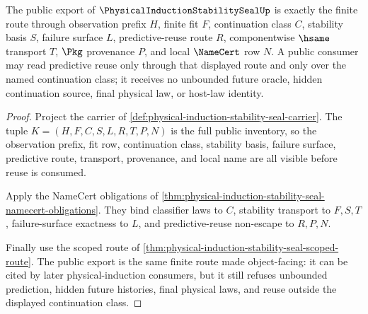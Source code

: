 \begin{theorem}
\label{thm:physical-induction-stability-seal-public-export}
The public export of $\PhysicalInductionStabilitySealUp$ is exactly the finite route through observation prefix $H$, finite fit $F$, continuation class $C$, stability basis $S$, failure surface $L$, predictive-reuse route $R$, componentwise $\hsame$ transport $T$, $\Pkg$ provenance $P$, and local $\NameCert$ row $N$. A public consumer may read predictive reuse only through that displayed route and only over the named continuation class; it receives no unbounded future oracle, hidden continuation source, final physical law, or host-law identity.
\end{theorem}
\begin{proof}
Project the carrier of \autoref{def:physical-induction-stability-seal-carrier}. The tuple $K=(H,F,C,S,L,R,T,P,N)$ is the full public inventory, so the observation prefix, fit row, continuation class, stability basis, failure surface, predictive route, transport, provenance, and local name are all visible before reuse is consumed.

Apply the NameCert obligations of \autoref{thm:physical-induction-stability-seal-namecert-obligations}. They bind classifier laws to $C$, stability transport to $F,S,T$, failure-surface exactness to $L$, and predictive-reuse non-escape to $R,P,N$.

Finally use the scoped route of \autoref{thm:physical-induction-stability-seal-scoped-route}. The public export is the same finite route made object-facing: it can be cited by later physical-induction consumers, but it still refuses unbounded prediction, hidden future histories, final physical laws, and reuse outside the displayed continuation class.
\end{proof}

